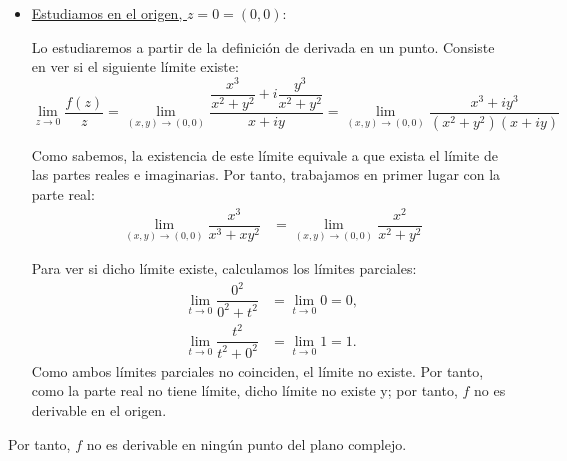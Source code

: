 \begin{ejercicio}
\begin{enumerate}
\begin{itemize}
            \item \ul{Estudiamos en el origen, $z=0=(0,0)$}:
            
            Lo estudiaremos a partir de la definición de derivada en un punto. Consiste en ver si el siguiente límite existe:
            \begin{equation*}
                \lim_{z\to 0}\dfrac{f(z)}{z} = \lim_{(x,y)\to (0,0)}\dfrac{\dfrac{x^3}{x^2+y^2}+i\dfrac{y^3}{x^2+y^2}}{x+iy} = \lim_{(x,y)\to (0,0)}\dfrac{x^3+iy^3}{(x^2+y^2)(x+iy)}
            \end{equation*}

            Como sabemos, la existencia de este límite equivale a que exista el límite de las partes reales e imaginarias. Por tanto, trabajamos en primer lugar con la parte real:
            \begin{align*}
                \lim_{(x,y)\to (0,0)}\dfrac{x^3}{x^3+xy^2}
                &= \lim_{(x,y)\to (0,0)}\dfrac{x^2}{x^2+y^2} 
            \end{align*}

            Para ver si dicho límite existe, calculamos los límites parciales:
            \begin{align*}
                \lim_{t\to 0} \dfrac{0^2}{0^2+t^2} &= \lim_{t\to 0} 0 = 0,\\
                \lim_{t\to 0} \dfrac{t^2}{t^2+0^2} &= \lim_{t\to 0} 1 = 1.
            \end{align*}
            Como ambos límites parciales no coinciden, el límite no existe. Por tanto, como la parte real no tiene límite, dicho límite no existe y; por tanto, $f$ no es derivable en el origen.
        \end{itemize}

        Por tanto, $f$ no es derivable en ningún punto del plano complejo.
    \end{enumerate}
\end{ejercicio}

